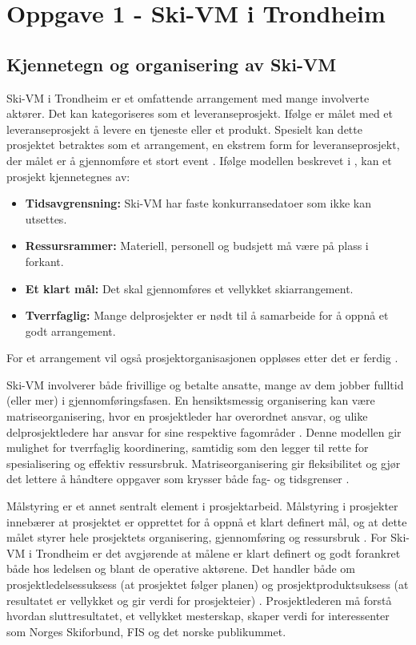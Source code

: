 \section{Oppgave 1 - Ski-VM i Trondheim}
\subsection{Kjennetegn og organisering av Ski-VM}
Ski-VM i Trondheim er et omfattende arrangement med mange involverte aktører. Det kan kategoriseres som et leveranseprosjekt. Ifølge \parencite[][s.165]{Teknologiledelse} er målet med et leveranseprosjekt å levere en tjeneste eller et produkt. Spesielt kan dette prosjektet betraktes som et arrangement, en ekstrem form for leveranseprosjekt, der målet er å gjennomføre et stort event \parencite[][s.165]{Teknologiledelse}. Ifølge modellen beskrevet i \cite[][s.164]{Teknologiledelse}, kan et prosjekt kjennetegnes av:
\begin{itemize}
    \item \textbf{Tidsavgrensning:} Ski-VM har faste konkurransedatoer som ikke kan utsettes.
    \item \textbf{Ressursrammer:} Materiell, personell og budsjett må være på plass i forkant.
    \item \textbf{Et klart mål:} Det skal gjennomføres et vellykket skiarrangement.
    \item \textbf{Tverrfaglig:} Mange delprosjekter er nødt til å samarbeide for å oppnå et godt arrangement.
\end{itemize}
For et arrangement vil også prosjektorganisasjonen oppløses etter det er ferdig \parencite[][s.165]{Teknologiledelse}.  

Ski-VM involverer både frivillige og betalte ansatte, mange av dem jobber fulltid (eller mer) i gjennomføringsfasen. En hensiktsmessig organisering kan være matriseorganisering, hvor en prosjektleder har overordnet ansvar, og ulike delprosjektledere har ansvar for sine respektive fagområder \parencite[][s.166]{Teknologiledelse}. Denne modellen gir mulighet for tverrfaglig koordinering, samtidig som den legger til rette for spesialisering og effektiv ressursbruk. Matriseorganisering gir fleksibilitet og gjør det lettere å håndtere oppgaver som krysser både fag- og tidsgrenser \parencite[][s.166]{Teknologiledelse}.

Målstyring er et annet sentralt element i prosjektarbeid. Målstyring i prosjekter innebærer at prosjektet er opprettet for å oppnå et klart definert mål, og at dette målet styrer hele prosjektets organisering, gjennomføring og ressursbruk \parencite[][s.164]{Teknologiledelse}. For Ski-VM i Trondheim er det avgjørende at målene er klart definert og godt forankret både hos ledelsen og blant de operative aktørene. Det handler både om prosjektledelsessuksess (at prosjektet følger planen) og prosjektproduktsuksess (at resultatet er vellykket og gir verdi for prosjekteier) \parencite[][s.165]{Teknologiledelse}. Prosjektlederen må forstå hvordan sluttresultatet, et vellykket mesterskap, skaper verdi for interessenter som Norges Skiforbund, FIS og det norske publikummet.

